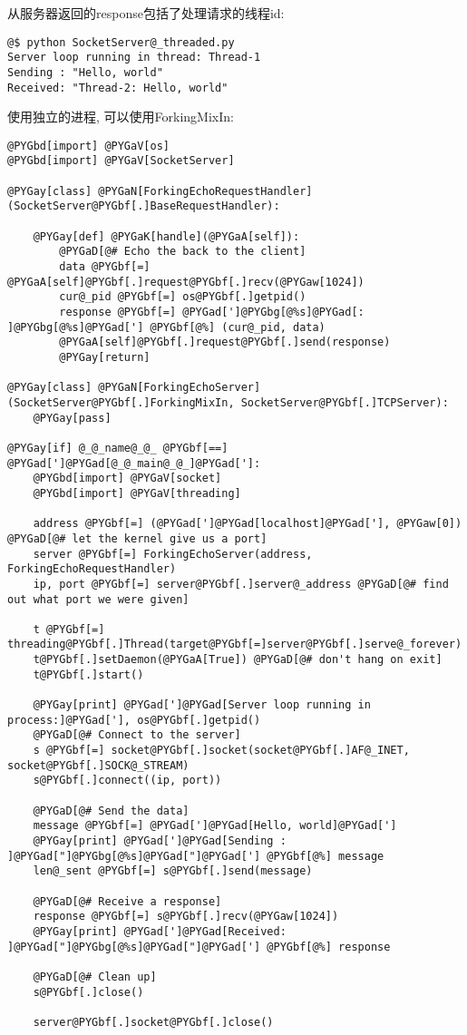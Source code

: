 \documentclass[a4paper,10pt,english]{manual}
\begin{document}
从服务器返回的response包括了处理请求的线程id:

\begin{Verbatim}[commandchars=@\[\]]
@$ python SocketServer@_threaded.py
Server loop running in thread: Thread-1
Sending : "Hello, world"
Received: "Thread-2: Hello, world"
\end{Verbatim}

使用独立的进程, 可以使用ForkingMixIn:

\begin{Verbatim}[commandchars=@\[\]]
@PYGbd[import] @PYGaV[os]
@PYGbd[import] @PYGaV[SocketServer]

@PYGay[class] @PYGaN[ForkingEchoRequestHandler](SocketServer@PYGbf[.]BaseRequestHandler):

    @PYGay[def] @PYGaK[handle](@PYGaA[self]):
        @PYGaD[@# Echo the back to the client]
        data @PYGbf[=] @PYGaA[self]@PYGbf[.]request@PYGbf[.]recv(@PYGaw[1024])
        cur@_pid @PYGbf[=] os@PYGbf[.]getpid()
        response @PYGbf[=] @PYGad[']@PYGbg[@%s]@PYGad[: ]@PYGbg[@%s]@PYGad['] @PYGbf[@%] (cur@_pid, data)
        @PYGaA[self]@PYGbf[.]request@PYGbf[.]send(response)
        @PYGay[return]

@PYGay[class] @PYGaN[ForkingEchoServer](SocketServer@PYGbf[.]ForkingMixIn, SocketServer@PYGbf[.]TCPServer):
    @PYGay[pass]

@PYGay[if] @_@_name@_@_ @PYGbf[==] @PYGad[']@PYGad[@_@_main@_@_]@PYGad[']:
    @PYGbd[import] @PYGaV[socket]
    @PYGbd[import] @PYGaV[threading]

    address @PYGbf[=] (@PYGad[']@PYGad[localhost]@PYGad['], @PYGaw[0]) @PYGaD[@# let the kernel give us a port]
    server @PYGbf[=] ForkingEchoServer(address, ForkingEchoRequestHandler)
    ip, port @PYGbf[=] server@PYGbf[.]server@_address @PYGaD[@# find out what port we were given]

    t @PYGbf[=] threading@PYGbf[.]Thread(target@PYGbf[=]server@PYGbf[.]serve@_forever)
    t@PYGbf[.]setDaemon(@PYGaA[True]) @PYGaD[@# don't hang on exit]
    t@PYGbf[.]start()

    @PYGay[print] @PYGad[']@PYGad[Server loop running in process:]@PYGad['], os@PYGbf[.]getpid()
    @PYGaD[@# Connect to the server]
    s @PYGbf[=] socket@PYGbf[.]socket(socket@PYGbf[.]AF@_INET, socket@PYGbf[.]SOCK@_STREAM)
    s@PYGbf[.]connect((ip, port))

    @PYGaD[@# Send the data]
    message @PYGbf[=] @PYGad[']@PYGad[Hello, world]@PYGad[']
    @PYGay[print] @PYGad[']@PYGad[Sending : ]@PYGad["]@PYGbg[@%s]@PYGad["]@PYGad['] @PYGbf[@%] message
    len@_sent @PYGbf[=] s@PYGbf[.]send(message)

    @PYGaD[@# Receive a response]
    response @PYGbf[=] s@PYGbf[.]recv(@PYGaw[1024])
    @PYGay[print] @PYGad[']@PYGad[Received: ]@PYGad["]@PYGbg[@%s]@PYGad["]@PYGad['] @PYGbf[@%] response

    @PYGaD[@# Clean up]
    s@PYGbf[.]close()

    server@PYGbf[.]socket@PYGbf[.]close()
\end{Verbatim}
\end{document}

